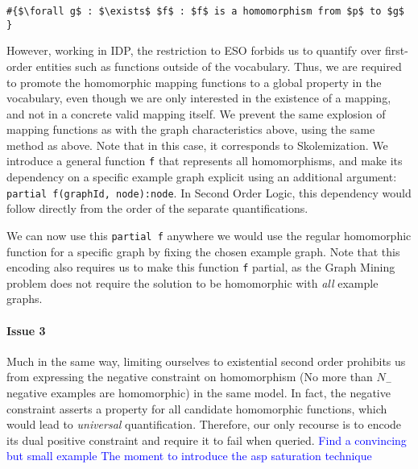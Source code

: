 \documentclass{article}
\theoremstyle{definition}
\newcommand{\matthias}[1]{\textcolor{blue}{\marginpar{\sc Matthias} #1}}
\begin{document}
\begin{lstlisting}[mathescape, caption=Quantifying over functions outside the vocabulary, label=QuantifyOutsideVocabulary,basicstyle=\fontfamily{lmvtt}\selectfont]
#{$\forall g$ : $\exists$ $f$ : $f$ is a homomorphism from $p$ to $g$ }
\end{lstlisting}
However, working in IDP, the restriction to ESO forbids us to quantify over first-order entities such as functions outside of the vocabulary.
Thus, we are required to promote the homomorphic mapping functions to a global property in the vocabulary, even though we are only interested in the existence of a mapping, and not in a concrete valid mapping itself.
We prevent the same explosion of mapping functions as with the graph characteristics above, using the same method as above. Note that in this case, it corresponds to Skolemization.
We introduce a general function \verb|f| that represents all homomorphisms, and make its dependency on a specific example graph explicit using an additional argument:
\verb|partial f(graphId, node):node|.
In Second Order Logic, this dependency would follow directly from the order of the separate quantifications.

We can now use this \verb|partial f| anywhere we would use the regular homomorphic function for a specific graph by fixing the chosen example graph.
Note that this encoding also requires us to make this function \verb|f| partial, as the Graph Mining problem does not require the solution to be homomorphic with \emph{all} example graphs.


\paragraph{Issue 3} Much in the same way, limiting ourselves to existential second order prohibits us from expressing the negative constraint on homomorphism (No more than $N_{-}$ negative examples are homomorphic) in the same model.
In fact, the negative constraint asserts a property for all candidate homomorphic functions, which would lead to \emph{universal} quantification.
Therefore, our only recourse is to encode its dual positive constraint and require it to fail when queried.\matthias{Find a convincing but small example}
\matthias{The moment to introduce the asp saturation technique}
\end{document}
